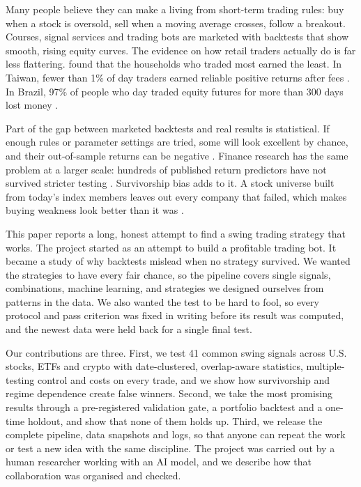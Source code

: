 \documentclass[11pt]{article}
\begin{document}
Many people believe they can make a living from short-term trading rules: buy when a stock is
oversold, sell when a moving average crosses, follow a breakout. Courses, signal services and
trading bots are marketed with backtests that show smooth, rising equity curves. The evidence on
how retail traders actually do is far less flattering. \citet{barber2000trading} found that the
households who traded most earned the least. In Taiwan, fewer than 1\% of day traders earned
reliable positive returns after fees \citep{barber2014speculator}. In Brazil, 97\% of people who day
traded equity futures for more than 300 days lost money \citep{chague2019daytrading}.

Part of the gap between marketed backtests and real results is statistical. If enough rules or
parameter settings are tried, some will look excellent by chance, and their out-of-sample returns
can be negative \citep{bailey2014pseudo}. Finance research has the same problem at a larger scale:
hundreds of published return predictors have not survived stricter testing
\citep{harvey2016cross}. Survivorship bias adds to it. A stock universe built from today's index
members leaves out every company that failed, which makes buying weakness look better than it was
\citep{brown1992survivorship,elton1996survivor}.

This paper reports a long, honest attempt to find a swing trading strategy that works. The project
started as an attempt to build a profitable trading bot. It became a study of why backtests mislead
when no strategy survived. We wanted the strategies to have every fair chance, so the pipeline
covers single signals, combinations, machine learning, and strategies we designed ourselves from
patterns in the data. We also wanted the test to be hard to fool, so every protocol and pass
criterion was fixed in writing before its result was computed, and the newest data were held back
for a single final test.

Our contributions are three. First, we test 41 common swing signals across U.S. stocks, ETFs and
crypto with date-clustered, overlap-aware statistics, multiple-testing control and costs on every
trade, and we show how survivorship and regime dependence create false winners. Second, we take
the most promising results through a pre-registered validation gate, a portfolio backtest and a
one-time holdout, and show that none of them holds up. Third, we release the complete pipeline,
data snapshots and logs, so that anyone can repeat the work or test a new idea with the same
discipline. The project was carried out by a human researcher working with an AI model, and we
describe how that collaboration was organised and checked.
\end{document}
